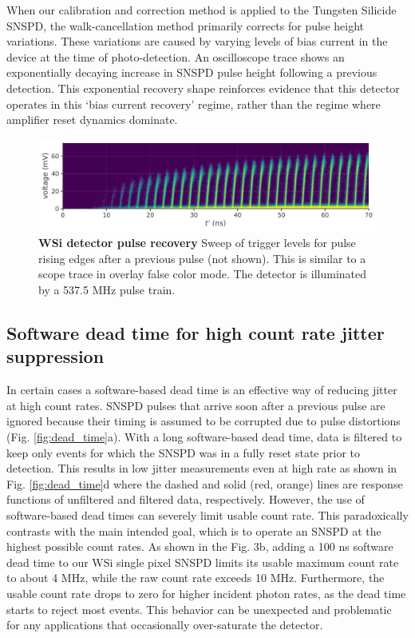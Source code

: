 \documentclass[11pt]{caltech_thesis} %
\begin{document}
When our calibration and correction method is applied to the Tungsten Silicide SNSPD, the walk-cancellation method primarily corrects for pulse height variations. These variations are caused by varying levels of bias current in the device at the time of photo-detection. An oscilloscope trace shows an exponentially decaying increase in SNSPD pulse height following a previous detection. This exponential recovery shape reinforces evidence that this detector operates in this `bias current recovery' regime, rather than the regime where amplifier reset dynamics dominate.

\hypertarget{fig:rise_exp}{%
\begin{figure}
\centering
\includegraphics[width=1\textwidth,height=\textheight]{./chapter_03/figs/rise_exp_light.pdf}
\caption[{WSi pulse exponential pulse recovery}]{\textbf{WSi detector pulse recovery} Sweep of trigger levels for pulse rising edges after a previous pulse (not shown). This is similar to a scope trace in overlay false color mode. The detector is illuminated by a 537.5 MHz pulse train.}
\label{fig:rise_exp}
\end{figure}
}

\hypertarget{software-dead-time-for-high-count-rate-jitter-suppression}{%
\subsection{Software dead time for high count rate jitter suppression}\label{software-dead-time-for-high-count-rate-jitter-suppression}}

In certain cases a software-based dead time is an effective way of reducing jitter at high count rates. SNSPD pulses that arrive soon after a previous pulse are ignored because their timing is assumed to be corrupted due to pulse distortions (Fig. \ref{fig:dead_time}a). With a long software-based dead time, data is filtered to keep only events for which the SNSPD was in a fully reset state prior to detection. This results in low jitter measurements even at high rate as shown in Fig. \ref{fig:dead_time}d where the dashed and solid (red, orange) lines are response functions of unfiltered and filtered data, respectively. However, the use of software-based dead times can severely limit usable count rate. This paradoxically contrasts with the main intended goal, which is to operate an SNSPD at the highest possible count rates. As shown in the Fig. 3b, adding a 100 ns software dead time to our WSi single pixel SNSPD limits its usable maximum count rate to about 4 MHz, while the raw count rate exceeds 10 MHz. Furthermore, the usable count rate drops to zero for higher incident photon rates, as the dead time starts to reject most events. This behavior can be unexpected and problematic for any applications that occasionally over-saturate the detector.
\end{document}
